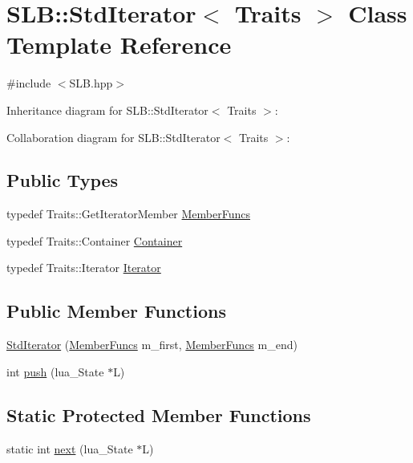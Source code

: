 \hypertarget{classSLB_1_1StdIterator}{}\section{S\+LB\+:\+:Std\+Iterator$<$ Traits $>$ Class Template Reference}
\label{classSLB_1_1StdIterator}


{\ttfamily \#include $<$S\+L\+B.\+hpp$>$}



Inheritance diagram for S\+LB\+:\+:Std\+Iterator$<$ Traits $>$\+:


Collaboration diagram for S\+LB\+:\+:Std\+Iterator$<$ Traits $>$\+:
\subsection*{Public Types}
\begin{DoxyCompactItemize}
\item 
typedef Traits\+::\+Get\+Iterator\+Member \hyperlink{classSLB_1_1StdIterator_ad7822e03cd31e30c8f2f6a393ce993b9}{Member\+Funcs}
\item 
typedef Traits\+::\+Container \hyperlink{classSLB_1_1StdIterator_aea113f18b9853918114083198d640da2}{Container}
\item 
typedef Traits\+::\+Iterator \hyperlink{classSLB_1_1StdIterator_aa762795d74dbc68a58e644cfb665418b}{Iterator}
\end{DoxyCompactItemize}
\subsection*{Public Member Functions}
\begin{DoxyCompactItemize}
\item 
\hyperlink{classSLB_1_1StdIterator_aedc353f371aeda76fc21f4268f0b558c}{Std\+Iterator} (\hyperlink{classSLB_1_1StdIterator_ad7822e03cd31e30c8f2f6a393ce993b9}{Member\+Funcs} m\+\_\+first, \hyperlink{classSLB_1_1StdIterator_ad7822e03cd31e30c8f2f6a393ce993b9}{Member\+Funcs} m\+\_\+end)
\item 
int \hyperlink{classSLB_1_1StdIterator_abfb1efa6670cf1e47be39afd26da10a9}{push} (lua\+\_\+\+State $\ast$L)
\end{DoxyCompactItemize}
\subsection*{Static Protected Member Functions}
\begin{DoxyCompactItemize}
\item 
static int \hyperlink{classSLB_1_1StdIterator_a7e2956299f8db36b8f51ce1cdf90b583}{next} (lua\+\_\+\+State $\ast$L)
\end{DoxyCompactItemize}
